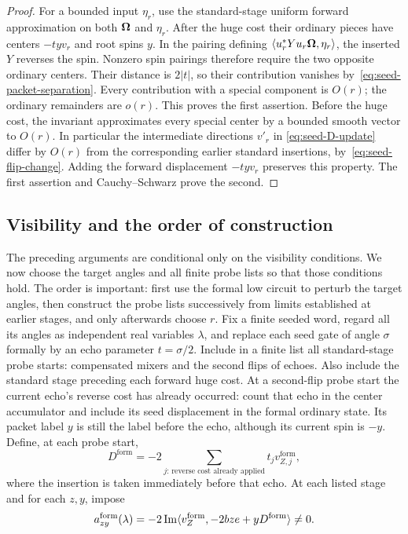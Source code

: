 \begin{proof}
For a bounded input \(\eta_r\), use the standard-stage uniform forward
approximation on both \(\boldsymbol\Omega\) and \(\eta_r\).  After the huge cost
their ordinary pieces have centers \(-tyv_r\) and root spins \(y\).
In the pairing defining
\(\langle u_r^*Yu_r\boldsymbol\Omega,\eta_r\rangle\), the inserted \(Y\) reverses the
spin.  Nonzero spin pairings therefore require the two opposite
ordinary centers.  Their distance is \(2|t|\), so their contribution
vanishes by~\eqref{eq:seed-packet-separation}.  Every contribution with
a special component is \(O(r)\); the ordinary remainders are \(o(r)\).
This proves the first assertion.  Before the huge cost, the invariant
approximates every special center by a bounded smooth vector to
\(O(r)\).  In particular the intermediate directions \(v'_r\) in
\eqref{eq:seed-D-update} differ by \(O(r)\) from the corresponding
earlier standard insertions, by~\eqref{eq:seed-flip-change}.
Adding the forward displacement
\(-tyv_r\) preserves this property.  The first assertion and
Cauchy--Schwarz prove the second.
\end{proof}

\subsection{Visibility and the order of construction}

The preceding arguments are conditional only on the visibility
conditions.  We now choose the target angles and all finite probe lists
so that those conditions hold.  The order is important: first use the
formal low circuit to perturb the target angles, then construct the
probe lists successively from limits established at earlier stages,
and only afterwards choose \(r\).  Fix a finite seeded word, regard all
its angles as independent real variables \(\lambda\), and replace each
seed gate of angle \(\sigma\) formally by an echo parameter
\(t=\sigma/2\).  Include in a finite list all
standard-stage probe starts: compensated mixers and the second flips
of echoes.  Also include the standard stage preceding each forward huge
cost.  At a second-flip probe start the current echo's reverse cost has
already occurred: count that echo in the center accumulator and include
its seed displacement in the formal ordinary state.  Its packet label
\(y\) is still the label before the echo, although its current spin is
\(-y\).  Define, at each probe start,
\[
 D^{\mathrm{form}}
 =-2\sum_{j:\,\text{reverse cost already applied}}
       t_jv_{Z,j}^{\mathrm{form}},
\]
where the insertion is taken immediately before that echo.  At each
listed stage and for each \(z,y\), impose
\begin{equation}
\label{eq:seed-formal-visibility}
 a_{zy}^{\mathrm{form}}(\lambda)
 =-2\operatorname{Im}\langle v_Z^{\mathrm{form}},-2bz e+yD^{\mathrm{form}}\rangle\neq0.
\end{equation}

